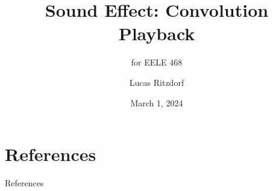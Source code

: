 \documentclass[
    aspectratio=169,
    xcolor=svgnames,
]{beamer}
\title{Sound Effect: Convolution Playback}
\subtitle{for EELE 468}
\author{Lucas Ritzdorf}
\institute{Montana State Unviersity}
\date{March 1, 2024}
\begin{document}
\maketitle







\section{References}
\begin{frame}[allowframebreaks]{References}
    \nocite{*}
    \printbibliography[heading=none]
\end{frame}
\end{document}
